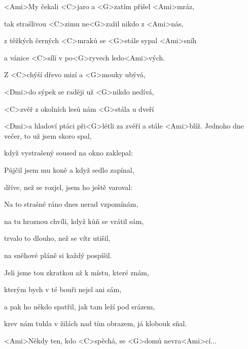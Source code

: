 
\zs
<Ami>My čekali <C>jaro a <G>zatím přišel <Ami>mráz,

tak strašlivou <C>zimu ne<G>zažil nikdo z <Ami>nás,

z těžkých černých <C>mraků se <G>stále sypal <Ami>sníh

a vánice <C>sílí v po<G>ryvech ledo<Ami>vých.

Z <C>chýší dřevo mizí a <G>mouky ubývá,

<Dmi>do sýpek se raději už <G>nikdo nedívá,

<C>zvěř z okolních lesů nám <G>stála u dveří

<Dmi>a hladoví ptáci při<G>létli za zvěří a stále <Ami>blíž.
\ks
\zs
Jednoho dne večer, to už jsem skoro spal,

když vystrašený soused na okno zaklepal:


Půjčil jsem mu koně a když sedlo zapínal,

dříve, než se rozjel, jsem ho ještě varoval:

\ks
\zs
Na to strašné ráno dnes nerad vzpomínám,

na tu hroznou chvíli, když kůň se vrátil sám,

trvalo to dlouho, než se vítr utišil,

na sněhové pláně si každý pospíšil.

Jeli jsme tou zkratkou až k místu, které znám,

kterým bych v té bouři nejel ani sám,

a pak ho někdo spatřil, jak tam leží pod srázem,

krev nám tuhla v žilách nad tím obrazem, já klobouk sňal.
\ks

<Ami>Někdy ten, kdo <C>spěchá, se <G>domů nevra<Ami>cí...
\kp
